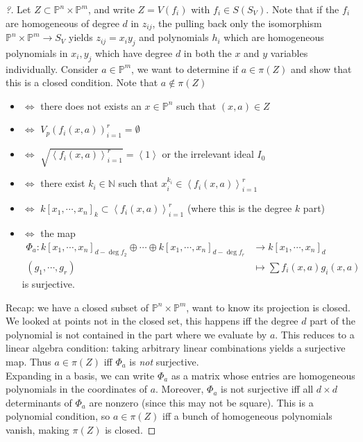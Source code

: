 \begin{proof}[?]

Let \(Z \subset {\mathbb{P}}^n \times{\mathbb{P}}^m\), and write
\(Z = V(f_i)\) with \(f_i \in S(S_V)\). Note that if the \(f_i\) are
homogeneous of degree \(d\) in \(z_{ij}\), the pulling back only the
isomorphism \({\mathbb{P}}^n\times{\mathbb{P}}^m \to S_V\) yields
\(z_{ij} = x_i y_j\) and polynomials \(h_i\) which are homogeneous
polynomials in \(x_i, y_j\) which have degree \(d\) in both the \(x\)
and \(y\) variables individually. Consider \(a\in {\mathbb{P}}^m\), we
want to determine if \(a\in \pi(Z)\) and show that this is a closed
condition. Note that \(a\not\in \pi(Z)\)

\begin{itemize}
\item
  \(\iff\) there does not exists an \(x\in {\mathbb{P}}^n\) such that
  \((x, a) \in Z\)
\item
  \(\iff\) \(V_p(f_i(x, a))_{i=1}^r = \emptyset\)
\item
  \(\iff\)
  \(\sqrt{\left\langle{f_i(x, a)}\right\rangle_{i=1}^r } = \left\langle{1}\right\rangle\)
  or the irrelevant ideal \(I_0\)
\item
  \(\iff\) there exist \(k_i \in {\mathbb{N}}\) such that
  \(x_i^{k_i} \in \left\langle{f_i(x, a)}\right\rangle_{i=1}^r\)
\item
  \(\iff\)
  \(k[x_1, \cdots, x_{n}]_k \subset \left\langle{f_i(x, a)}\right\rangle_{i=1}^r\)
  (where this is the degree \(k\) part)
\item
  \(\iff\) the map
  \begin{align*}  
  \Phi_a: k[x_1, \cdots, x_{n}]_{d - \deg f_2} \oplus \cdots \oplus k[x_1, \cdots, x_{n}]_{d - \deg f_r} &\to k[x_1, \cdots, x_{n}]_d \\
  (g_1, \cdots, g_r) &\mapsto \sum f_i(x, a) g_i (x, a)
  \end{align*}
  is surjective.
\end{itemize}

Recap: we have a closed subset of
\({\mathbb{P}}^n \times{\mathbb{P}}^m\), want to know its projection is
closed. We looked at points not in the closed set, this happens iff the
degree \(d\) part of the polynomial is not contained in the part where
we evaluate by \(a\). This reduces to a linear algebra condition: taking
arbitrary linear combinations yields a surjective map. Thus
\(a\in \pi(Z)\) iff \(\Phi_a\) is \emph{not} surjective.\\

Expanding in a basis, we can write \(\Phi_a\) as a matrix whose entries
are homogeneous polynomials in the coordinates of \(a\). Moreover,
\(\Phi_a\) is not surjective iff all \(d\times d\) determinants of
\(\Phi_a\) are nonzero (since this may not be square). This is a
polynomial condition, so \(a\in \pi(Z)\) iff a bunch of homogeneous
polynomials vanish, making \(\pi(Z)\) is closed.

\end{proof}

